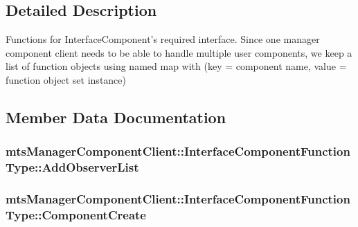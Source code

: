 \subsection{Detailed Description}
Functions for Interface\-Component's required interface. Since one manager component client needs to be able to handle multiple user components, we keep a list of function objects using named map with (key = component name, value = function object set instance) 

\subsection{Member Data Documentation}
\hypertarget{structmts_manager_component_client_1_1_interface_component_function_type_af4546cad19d98c11d2022d4ac060d344}{
\subsubsection[{Add\-Observer\-List}]{ mts\-Manager\-Component\-Client\-::\-Interface\-Component\-Function\-Type\-::\-Add\-Observer\-List}}\label{structmts_manager_component_client_1_1_interface_component_function_type_af4546cad19d98c11d2022d4ac060d344}
\hypertarget{structmts_manager_component_client_1_1_interface_component_function_type_a0ca3f74d401e16140df73ed6d68d3781}{
\subsubsection[{Component\-Create}]{ mts\-Manager\-Component\-Client\-::\-Interface\-Component\-Function\-Type\-::\-Component\-Create}}\label{structmts_manager_component_client_1_1_interface_component_function_type_a0ca3f74d401e16140df73ed6d68d3781}
